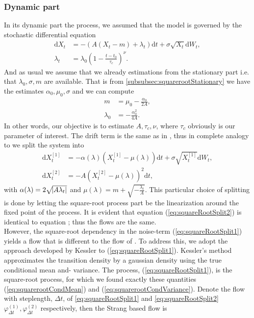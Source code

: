 \subsubsection{Dynamic part}\label{subsubsec:squarerootDynamic}
In its dynamic part the process, we assumed that the model is governed by the stochastic differential equation
\begin{align}
    \mathrm{d}X_t &= -\left(A\left(X_t - m\right) + \lambda_t\right)\mathrm{d}t + \sigma \sqrt{X_t} \mathrm{d}W_t, \label{eq:dynamicsquarerootSDE}\\
    \lambda_t &= \lambda_0\left(1 - \frac{t - t_0}{\tau_c}\right)^\nu.
\end{align}
And as usual we assume that we already estimations from the stationary part i.e. that $\lambda_0, \sigma, m$ are available. That is from \ref{subsubsec:squarerootStationary} we have the estimates $\alpha_0, \mu_0, \sigma$ and we can compute
\begin{align}
    m &= \mu_0 - \frac{\alpha_0}{2A},\\
    \lambda_0 &= - \frac{\alpha_0^2}{4A}.
\end{align}
In other words, our objective is to estimate $A, \tau_c, \nu$, where $\tau_c$ obviously is our parameter of interest. The drift term is the same as in \cite{Ditlevsen2023}, thus in complete analogy to \cite[(S9, S10)]{DitlevsenSupplementary} we split the system into
\begin{align}
    \mathrm{d}X_t^{[1]} &= -\alpha(\lambda)\left(X_t^{[1]} - \mu(\lambda)\right)  \mathrm{d}t + \sigma \sqrt{X_t^{[1]}} \mathrm{d}W_t, \label{eq:squareRootSplit1} \\
    \mathrm{d}X_t^{[2]} &= - A \left(X_t^{[2]} - \mu(\lambda)\right)^2 \mathrm{d}t, \label{eq:squareRootSplit2}
\end{align}
with $\alpha(\lambda) = 2\sqrt{\abs{A\lambda_t}}$ and $\mu(\lambda) = m + \sqrt{-\frac{\lambda_t}{A}}$.
This particular choice of splitting is done by letting the square-root process part be the linearization around the fixed point of the process. It is evident that equation (\ref{eq:squareRootSplit2}) is identical to equation \cite[(S10)]{DitlevsenSupplementary}; thus the flows are the same.\\ However, the square-root dependency in the noise-term (\ref{eq:squareRootSplit1}) yields a flow that is different to the flow of \cite[(S9)]{DitlevsenSupplementary}. To address this, we adopt the approach developed by Kessler \cite{Kessler1997} to (\ref{eq:squareRootSplit1}). Kessler's method approximates the transition density by a gaussian density using the true conditional mean and- variance. The process, (\ref{eq:squareRootSplit1}), is the square-root process, for which we found exactly these quantities (\ref{eq:squarerootCondMean}) and (\ref{eq:squarerootCondVariance}). Denote the flow with steplength, $\Delta t$, of \ref{eq:squareRootSplit1} and \ref{eq:squareRootSplit2} $\varphi_{\Delta t}^{(1)}, \varphi_{\Delta t}^{(2)}$ respectively, then the Strang based flow is 
